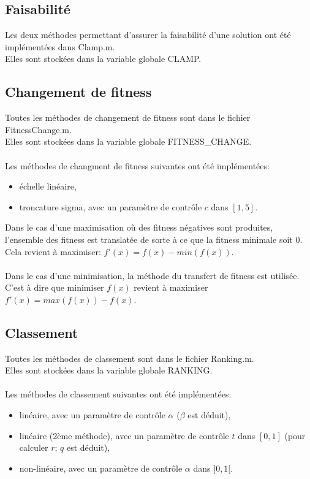\documentclass[12pt, letterpaper]{article}
\begin{document}
\subsection{Faisabilité}

Les deux méthodes permettant d'assurer la faisabilité d'une solution
ont été implémentées dans Clamp.m.\\
Elles sont stockées dans la variable globale CLAMP.

\subsection{Changement de fitness}

Toutes les méthodes de changement de fitness sont dans le fichier
\\\-FitnessChange.m.\\
Elles sont stockées dans la variable globale FITNESS\_CHANGE.
\\\\
Les méthodes de changment de fitness suivantes ont été implémentées:
\begin{itemize}
\item échelle linéaire,
  
\item troncature sigma, avec un paramètre de contrôle $c$ dans $[1, 5]$.
\end{itemize}
Dans le cas d'une maximisation où des fitness négatives sont produites,
l'ensemble des fitness est translatée de sorte à ce que la fitness
minimale soit 0.\\
Cela revient à maximiser: $f'(x) = f(x) - min(f(x))$.
\\
\\
Dans le cas d'une minimisation, la méthode du transfert de fitness est
utilisée.\\
C'est à dire que minimiser $f(x)$ revient à maximiser
$f'(x) = max(f(x)) - f(x)$.

\subsection{Classement}
Toutes les méthodes de classement sont dans le fichier Ranking.m.\\
Elles sont stockées dans la variable globale RANKING.
\\\\
Les méthodes de classement suivantes ont été implémentées:
\begin{itemize}
\item linéaire, avec un paramètre de contrôle $\alpha$ ($\beta$ est déduit),
  
\item linéaire (2ème méthode), avec un paramètre de contrôle $t$ dans $[0, 1]$ (pour calculer $r$; $q$ est déduit),
  
\item non-linéaire, avec un paramètre de contrôle $\alpha$ dans $]0, 1[$.
\end{itemize}
\end{document}

